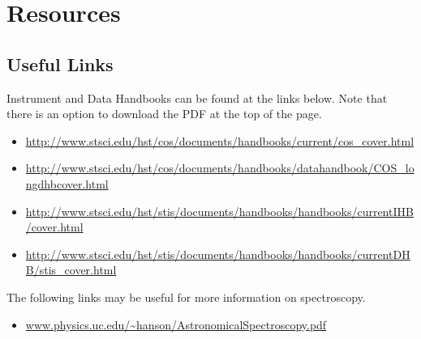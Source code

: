 \chapter{Resources}
\label{ch:links}
 
\section{Useful Links }
Instrument and Data Handbooks can be found at the links below.  Note that there is an option to download the PDF at the top of the page.
\begin{itemize}
\item \url{http://www.stsci.edu/hst/cos/documents/handbooks/current/cos_cover.html}
\item \url{http://www.stsci.edu/hst/cos/documents/handbooks/datahandbook/COS_longdhbcover.html}
\item \url{http://www.stsci.edu/hst/stis/documents/handbooks/handbooks/currentIHB/cover.html}
\item \url{http://www.stsci.edu/hst/stis/documents/handbooks/handbooks/currentDHB/stis_cover.html}
\end{itemize}

The following links may be useful for more information on spectroscopy.
\begin{itemize}
\item \url{www.physics.uc.edu/~hanson/AstronomicalSpectroscopy.pdf}
\end{itemize}
